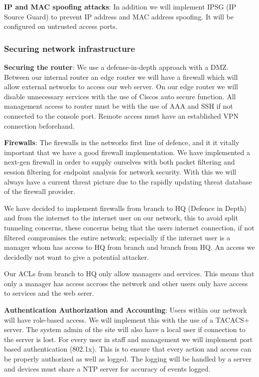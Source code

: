 \textbf{IP and MAC spoofing attacks}: In addition we will implement IPSG (IP Source Guard) to prevent IP address and MAC address spoofing. It will be configured on untrusted access ports.

\subsubsection{Securing network infrastructure}

\textbf{Securing the router}: We use a defense-in-depth approach with a DMZ. Between our internal router an edge router we will have a firewall which will allow external networks to access our web server. On our edge router we will disable unnecessary services with the use of Ciscos auto secure function. All management access to router must be with the use of AAA and SSH if not connected to the console port. Remote access must have an established VPN connection beforehand.

\textbf{Firewalls}: The firewalls in the networks first line of defence, and it it vitally important that we have a good firewall implementation. We have implemented a next-gen firewall in order to supply ourselves with both packet filtering and session filtering for endpoint analysis for network security. With this we will always have a current threat picture due to the rapidly updating threat database of the firewall provider.

We have decided to implement firewalls from branch to HQ (Defence in Depth) and from the internet to the internet user on our network, this to avoid split tunneling concerns, these concerns being that the users internet connection, if not filtered compromises the entire network; especially if the internet user is a manager whom has access to HQ from branch and branch from HQ. An access we decidedly not want to give a potential attacker.

Our ACLs from branch to HQ only allow managers and services. This means that only a manager has access accross the network and other users only have access to services and the web serer.

\textbf{Authentication Authorization and Accounting}: Users within our network will have role-based access. We will implement this with the use of a TACACS+ server. The system admin of the site will also have a local user if connection to the server is lost. For every user in staff and management we will implement port based authentication (802.1x). This is to ensure that every action and access can be properly authorized as well as logged. The logging will be handled by a server and devices must share a NTP server for accuracy of events logged.


